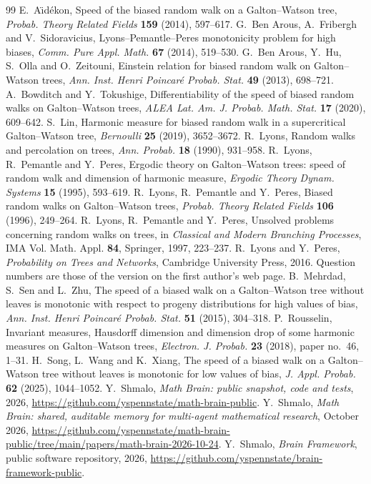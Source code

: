\documentclass[11pt]{amsart}
\theoremstyle{definition}
\begin{document}
\begin{thebibliography}{99}
 E.~A\"{\i}d\'ekon, Speed of the biased random walk on a Galton--Watson tree,
\emph{Probab. Theory Related Fields} \textbf{159} (2014), 597--617.
 G.~Ben Arous, A.~Fribergh and V.~Sidoravicius, Lyons--Pemantle--Peres monotonicity problem for high
biases, \emph{Comm. Pure Appl. Math.} \textbf{67} (2014), 519--530.
 G.~Ben Arous, Y.~Hu, S.~Olla and O.~Zeitouni, Einstein relation for biased random walk on
Galton--Watson trees, \emph{Ann. Inst. Henri Poincar\'e Probab. Stat.} \textbf{49} (2013), 698--721.
 A.~Bowditch and Y.~Tokushige, Differentiability of the speed of biased random walks on
Galton--Watson trees, \emph{ALEA Lat. Am. J. Probab. Math. Stat.} \textbf{17} (2020), 609--642.
 S.~Lin, Harmonic measure for biased random walk in a supercritical Galton--Watson tree,
\emph{Bernoulli} \textbf{25} (2019), 3652--3672.
 R.~Lyons, Random walks and percolation on trees, \emph{Ann. Probab.} \textbf{18} (1990),
931--958.
 R.~Lyons, R.~Pemantle and Y.~Peres, Ergodic theory on Galton--Watson trees: speed of random walk
and dimension of harmonic measure, \emph{Ergodic Theory Dynam. Systems} \textbf{15} (1995), 593--619.
 R.~Lyons, R.~Pemantle and Y.~Peres, Biased random walks on Galton--Watson trees,
\emph{Probab. Theory Related Fields} \textbf{106} (1996), 249--264.
 R.~Lyons, R.~Pemantle and Y.~Peres, Unsolved problems concerning random walks on trees, in
\emph{Classical and Modern Branching Processes}, IMA Vol. Math. Appl. \textbf{84}, Springer, 1997, 223--237.
 R.~Lyons and Y.~Peres, \emph{Probability on Trees and Networks}, Cambridge University Press,
2016. Question numbers are those of the version on the first author's web page.
 B.~Mehrdad, S.~Sen and L.~Zhu, The speed of a biased walk on a Galton--Watson tree without leaves is
monotonic with respect to progeny distributions for high values of bias, \emph{Ann. Inst. Henri Poincar\'e
Probab. Stat.} \textbf{51} (2015), 304--318.
 P.~Rousselin, Invariant measures, Hausdorff dimension and dimension drop of some harmonic
measures on Galton--Watson trees, \emph{Electron. J. Probab.} \textbf{23} (2018), paper no.~46, 1--31.
 H.~Song, L.~Wang and K.~Xiang, The speed of a biased walk on a Galton--Watson tree without leaves is
monotonic for low values of bias, \emph{J. Appl. Probab.} \textbf{62} (2025), 1044--1052.
 Y.~Shmalo, \emph{Math Brain: public snapshot, code and tests}, 2026,
\url{https://github.com/yspennstate/math-brain-public}.
 Y.~Shmalo, \emph{Math Brain: shared, auditable memory for multi-agent mathematical research},
October 2026, \url{https://github.com/yspennstate/math-brain-public/tree/main/papers/math-brain-2026-10-24}.
 Y.~Shmalo, \emph{Brain Framework}, public software repository, 2026,
\url{https://github.com/yspennstate/brain-framework-public}.
\end{thebibliography}
\end{document}
